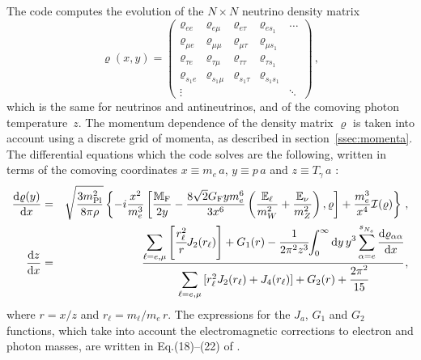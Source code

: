 \documentclass[notitlepage,showpacs,preprintnumbers,amsmath,amssymb,superscriptaddress,prd,onecolumn]{revtex4-1}
\begin{document}
The code computes the evolution of the
$N\times N$ neutrino density matrix
\begin{equation}\label{eq:varrho-B4}
\varrho(x, y)
=
\left(
\begin{array}{ccccc}
\varrho_{ee}&\varrho_{e\mu}&\varrho_{e\tau}&\varrho_{es_1}&\ldots\\
\varrho_{\mu e}&\varrho_{\mu\mu}&\varrho_{\mu\tau}&\varrho_{\mu s_1}&\\
\varrho_{\tau e}&\varrho_{\tau\mu}&\varrho_{\tau\tau}&\varrho_{\tau s_1}&\\
\varrho_{s_1e}&\varrho_{s_1\mu}&\varrho_{s_1\tau}&\varrho_{s_1s_1}&\\
\vdots&&&&\ddots
\end{array}
\right)\,,
\end{equation}
which is the same for neutrinos and antineutrinos,
and of the comoving photon temperature~$z$.
The momentum dependence of the density matrix $\varrho$ is taken into account
using a discrete grid of momenta, as described in section~\ref{ssec:momenta}.
The differential equations which the code solves are the following,
written in terms of the comoving coordinates
$x\equiv m_e\, a$, $y\equiv p\, a$ and $z\equiv T_\gamma\, a$
\cite{deSalas:2016ztq,Mirizzi:2012we,Saviano:2013ktj,Mangano:2001iu}:
%
\begin{eqnarray}\label{eq:drho_dx_nxn}
\frac{{\rm d}\varrho(y)}{{\rm d}x}
&=&
\sqrt{\frac{3 m^2_{\rm Pl}}{8\pi\rho}}
\left\{
    -i \frac{x^2}{m_e^3}
    \left[
        \frac{\mathbb{M}_{\rm F}}{2y}
        -
        \frac{8\sqrt{2}G_{\rm F} y m_e^6}{3x^6}
        \left(
            \frac{\mathbb{E}_\ell}{m_W^2}
            +
            \frac{\mathbb{E}_\nu}{m_Z^2}
        \right),
    \varrho
    \right]
    +\frac{m_e^3}{x^4}\mathcal{I(\varrho)}
\right\}\,,
\nonumber\\
\label{eq:dz_dx_nxn}
\frac{\mathrm{d}z}{\mathrm{d}x}
&=&
\cfrac{
{\displaystyle \sum_{\ell=e,\mu}}
\left[
\cfrac{r_\ell^2}{r} J_2(r_\ell)
\right]
+ G_1(r)
- \cfrac{1}{2\pi^2z^3}
    {\displaystyle \int_0^\infty \mathrm{d}y\,y^3\sum_{\alpha=e}^{s_{N_s}^{}}\cfrac{\mathrm{d}\varrho_{\alpha \alpha}}{\mathrm{d}x}}
}{
{\displaystyle \sum_{\ell=e,\mu}}
\left[
r^2_\ell J_2(r_\ell)
+ J_4(r_\ell)
\right]
+ G_2(r)
+ \cfrac{2\pi^2}{15}
}\,,
\end{eqnarray}
where $r=x/z$ and $r_\ell=m_\ell/m_e\,r$.
The expressions for the $J_a$, $G_1$ and $G_2$ functions,
which take into account the electromagnetic corrections to electron and photon masses,
are written in Eq.(18)--(22) of \cite{Mangano:2001iu}.
\end{document}
